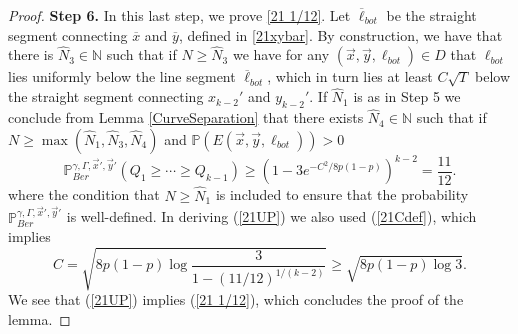 \begin{proof}
	
	\noindent\textbf{Step 6.} In this last step, we prove \eqref{21 1/12}. Let $\overline{\ell}_{bot}$ be the straight segment connecting $\overline{x}$ and $\overline{y}$, defined in \eqref{21xybar}. By construction, we have that there is $\hat{N}_3 \in \mathbb{N}$ such that if $N \geq \hat{N}_3$ we have for any $(\vec{x}, \vec{y}, \ell_{bot}) \in D$ that $\ell_{bot}$ lies uniformly below the line segment $\overline{\ell}_{bot}$, which in turn lies at least $C \sqrt{T}$ below the straight segment connecting $x_{k-2}'$ and $y_{k-2}'$. If $\hat{N}_1$ is as in Step 5 we conclude from Lemma \ref{CurveSeparation} that there exists $\hat{N}_4 \in \mathbb{N}$ such that if $N \geq \max(\hat{N}_1, \hat{N}_3, \hat{N}_4)$ and $\mathbb{P}(E(\vec{x},\vec{y},\ell_{bot})) > 0$ 
	\begin{equation}\label{21UP}
		\mathbb{P}^{\gamma, \Gamma,\vec{x}',\vec{y}'}_{Ber} \left( Q_1 \geq \cdots \geq Q_{k-1} \right) \geq \left(1-3e^{-C^2/8p(1-p)}\right)^{k-2} = \frac{11}{12}.
	\end{equation}
	where the condition that $N \geq \hat{N}_1 $ is included to ensure that the probability $\mathbb{P}^{\gamma, \Gamma,\vec{x}',\vec{y}'}_{Ber} $ is well-defined. In deriving (\ref{21UP}) we also used (\ref{21Cdef}), which implies
	$$C = \sqrt{ 8p(1-p) \log\frac{3}{1-(11/12)^{1/(k-2)}}} \geq \sqrt{8p(1-p) \log 3}.$$
	We see that (\ref{21UP}) implies (\ref{21 1/12}), which concludes the proof of the lemma.
\end{proof}


